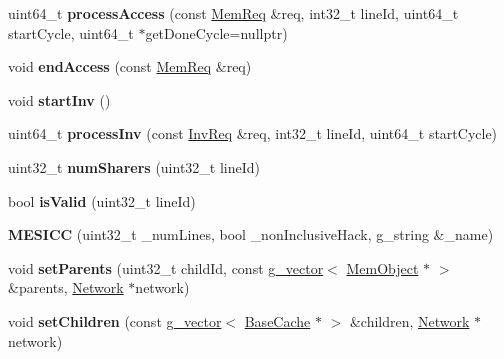 \begin{DoxyCompactItemize}
\item 
\hypertarget{classMESICC_aa8e01a308fd975cb06ed958fe79b5f5c}{uint64\-\_\-t {\bfseries process\-Access} (const \hyperlink{structMemReq}{Mem\-Req} \&req, int32\-\_\-t line\-Id, uint64\-\_\-t start\-Cycle, uint64\-\_\-t $\ast$get\-Done\-Cycle=nullptr)}\label{classMESICC_aa8e01a308fd975cb06ed958fe79b5f5c}

\item 
\hypertarget{classMESICC_a191b816ae3926a67e832e154682d1556}{void {\bfseries end\-Access} (const \hyperlink{structMemReq}{Mem\-Req} \&req)}\label{classMESICC_a191b816ae3926a67e832e154682d1556}

\item 
\hypertarget{classMESICC_a75c6b7abe753289c3c3e4b63a240bfe0}{void {\bfseries start\-Inv} ()}\label{classMESICC_a75c6b7abe753289c3c3e4b63a240bfe0}

\item 
\hypertarget{classMESICC_adcf52b6d718a2dde14c7c65dcc9556b0}{uint64\-\_\-t {\bfseries process\-Inv} (const \hyperlink{structInvReq}{Inv\-Req} \&req, int32\-\_\-t line\-Id, uint64\-\_\-t start\-Cycle)}\label{classMESICC_adcf52b6d718a2dde14c7c65dcc9556b0}

\item 
\hypertarget{classMESICC_afe175acbb1827ab513a14b42bc9c6672}{uint32\-\_\-t {\bfseries num\-Sharers} (uint32\-\_\-t line\-Id)}\label{classMESICC_afe175acbb1827ab513a14b42bc9c6672}

\item 
\hypertarget{classMESICC_a71f60cbea5b1703241317aca971dccca}{bool {\bfseries is\-Valid} (uint32\-\_\-t line\-Id)}\label{classMESICC_a71f60cbea5b1703241317aca971dccca}

\item 
\hypertarget{classMESICC_a04c6c7d9cb233a108ee1232fc9fbad85}{{\bfseries M\-E\-S\-I\-C\-C} (uint32\-\_\-t \-\_\-num\-Lines, bool \-\_\-non\-Inclusive\-Hack, g\-\_\-string \&\-\_\-name)}\label{classMESICC_a04c6c7d9cb233a108ee1232fc9fbad85}

\item 
\hypertarget{classMESICC_a243383c1a22aaad6d4f82466394d5f3d}{void {\bfseries set\-Parents} (uint32\-\_\-t child\-Id, const \hyperlink{classg__vector}{g\-\_\-vector}$<$ \hyperlink{classMemObject}{Mem\-Object} $\ast$ $>$ \&parents, \hyperlink{classNetwork}{Network} $\ast$network)}\label{classMESICC_a243383c1a22aaad6d4f82466394d5f3d}

\item 
\hypertarget{classMESICC_a521b3f23da4cdeecb2bd1a6b46cde861}{void {\bfseries set\-Children} (const \hyperlink{classg__vector}{g\-\_\-vector}$<$ \hyperlink{classBaseCache}{Base\-Cache} $\ast$ $>$ \&children, \hyperlink{classNetwork}{Network} $\ast$network)}\label{classMESICC_a521b3f23da4cdeecb2bd1a6b46cde861}


\end{DoxyCompactItemize}
